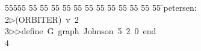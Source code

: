 %
%
\begin{tabbing}
55555 \= 55 \= 55 \= 55 \= 55 \= 55 \= 55 \= 55 \= 55 \= 55 \= 55 \= 55 \= 55 \= \>petersen:\\[0pt]
2\>$\triangleright$\>(ORBITER)\ v\ 2\ \\[0pt]
3\>$\triangleright$\>$\triangleright$\>define\ G\ graph\ Johnson\ 5\ 2\ 0\ end\\[0pt]
4\>\end{tabbing}
